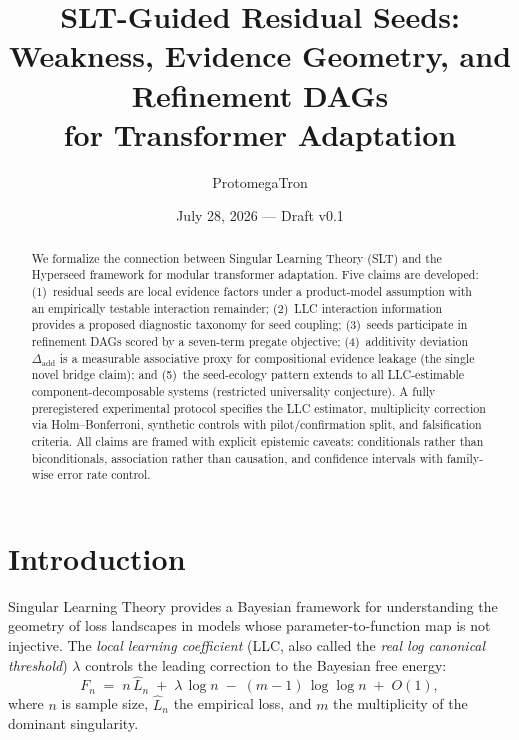 \documentclass[11pt,a4paper]{article}
\title{%
  SLT-Guided Residual Seeds:\\
  Weakness, Evidence Geometry, and Refinement DAGs\\
  for Transformer Adaptation%
}
\author{ProtomegaTron}
\date{July 28, 2026 --- Draft v0.1}
\theoremstyle{definition}
\theoremstyle{remark}
\newcommand{\LLC}{\lambda}
\newcommand{\Dadd}{\Delta_{\mathrm{add}}}
\begin{document}
\maketitle

\begin{abstract}
We formalize the connection between Singular Learning Theory (SLT) and the
Hyperseed framework for modular transformer adaptation.  Five claims are
developed: (1)~residual seeds are local evidence factors under a product-model
assumption with an empirically testable interaction remainder; (2)~LLC
interaction information provides a proposed diagnostic taxonomy for seed coupling;
(3)~seeds participate in refinement DAGs scored by a seven-term pregate
objective; (4)~additivity deviation $\Dadd$ is a measurable associative proxy
for compositional evidence leakage (the single novel bridge claim); and (5)~the
seed-ecology pattern extends to all LLC-estimable component-decomposable
systems (restricted universality conjecture).  A fully preregistered
experimental protocol specifies the LLC estimator, multiplicity correction via
Holm--Bonferroni, synthetic controls with pilot/confirmation split, and
falsification criteria.  All claims are framed with explicit epistemic caveats:
conditionals rather than biconditionals, association rather than causation, and
confidence intervals with family-wise error rate control.
\end{abstract}

\section{Introduction}\label{sec:intro}

Singular Learning Theory \cite{Watanabe2009} provides a Bayesian framework for
understanding the geometry of loss landscapes in models whose parameter-to-function
map is not injective.  The \emph{local learning coefficient} (LLC, also called
the \emph{real log canonical threshold}) $\LLC$ controls the leading correction
to the Bayesian free energy:
\begin{equation}\label{eq:free-energy}
  F_n \;=\; n\,\hat{L}_n \;+\; \LLC\,\log n
       \;-\; (m-1)\,\log\log n \;+\; O(1),
\end{equation}
where $n$ is sample size, $\hat{L}_n$ the empirical loss, and $m$ the
multiplicity of the dominant singularity.
\end{document}
